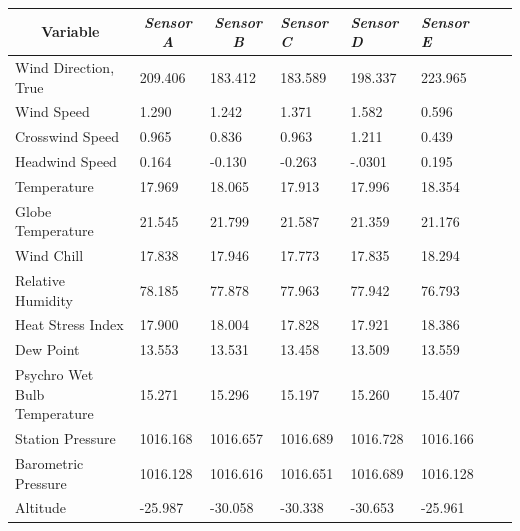 \documentclass[a4paper,12pt]{article} %
\begin{document}
\begin{enumerate}
\begin{table}[H]
\centering
\begin{tabular}{llllllll}
\multicolumn{1}{c}{\textbf{Variable}} & \multicolumn{1}{c}{\textit{Sensor A}} & \multicolumn{1}{c}{\textit{Sensor B}} & \textit{Sensor C} & \textit{Sensor D} & \textit{Sensor E}  \\ \hline
Wind Direction, True                  & 209.406               & 183.412               & 183.589             & 198.337            & 223.965 \\
Wind Speed             & 1.290                                 &1.242                     & 1.371             & 1.582            & 0.596 \\
Crosswind Speed             &0.965          &0.836                     & 0.963             & 1.211            & 0.439 \\
Headwind Speed             &0.164          &-0.130                     & -0.263             & -.0301            & 0.195 \\
Temperature             &17.969          &18.065                     &17.913             &17.996            & 18.354 \\
Globe Temperature             &21.545          &21.799                     &21.587             &21.359            &21.176 \\
Wind Chill             &17.838          &17.946                     &17.773             &17.835            & 18.294 \\
Relative Humidity             &78.185          &77.878                     &77.963             &77.942            & 76.793 \\
Heat Stress Index             &17.900          &18.004                     &17.828             &17.921            & 18.386 \\
Dew Point             &13.553          &13.531                     &13.458             &13.509            & 13.559 \\
Psychro Wet Bulb Temperature             &15.271          &15.296                     &15.197             &15.260            & 15.407 \\
Station Pressure             &1016.168          &1016.657                 &1016.689             &1016.728            & 1016.166 \\
Barometric Pressure             &1016.128          &1016.616                &1016.651             &1016.689            & 1016.128 \\
Altitude             &-25.987          &-30.058                 &-30.338             &-30.653            & -25.961 \\

\end{tabular}
\end{table}
\end{enumerate}
\end{document}
